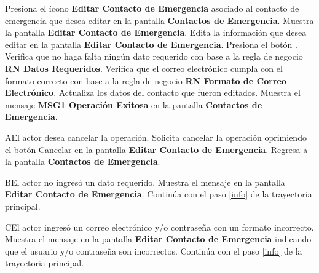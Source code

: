  \begin{UCtrayectoria}
 	
 	\UCpaso [\UCactor] Presiona el ícono \textbf{Editar Contacto de Emergencia} asociado al contacto de emergencia que desea editar en la pantalla \textbf{Contactos de Emergencia}.
 	\UCpaso Muestra la pantalla \textbf{Editar Contacto de Emergencia}.
 	\UCpaso [\UCactor] Edita la información que desea editar en la pantalla \textbf{Editar Contacto de Emergencia}. \label{info}
 	\UCpaso [\UCactor] Presiona el botón .
	\UCpaso Verifica que no haga falta ningún dato requerido con base a la regla de negocio \textbf{RN Datos Requeridos}.
	\UCpaso Verifica que el correo electrónico cumpla con el formato correcto con base a la regla de negocio \textbf{RN Formato de Correo Electrónico}.
	\UCpaso Actualiza los datos del contacto que fueron editados.
	\UCpaso Muestra el mensaje \textbf{MSG1 Operación Exitosa} en la pantalla \textbf{Contactos de Emergencia}.
    
 \end{UCtrayectoria}

 \begin{UCtrayectoriaA}{A}{El actor desea cancelar la operación.}
    \UCpaso[\UCactor] Solicita cancelar la operación oprimiendo el botón Cancelar en la pantalla \textbf{Editar Contacto de Emergencia}.
   \UCpaso Regresa a la pantalla \textbf{Contactos de Emergencia}.
 \end{UCtrayectoriaA}
 
 \begin{UCtrayectoriaA}{B}{El actor no ingresó un dato requerido.}
    \UCpaso[\UCsist] Muestra el mensaje  en la pantalla \textbf{Editar Contacto de Emergencia}.
    \UCpaso[] Continúa con el paso \ref{info} de la trayectoria principal.
 \end{UCtrayectoriaA}
 
 \begin{UCtrayectoriaA}{C}{El actor ingresó un correo electrónico y/o contraseña con un formato incorrecto.}
    \UCpaso[\UCsist] Muestra el mensaje  en la pantalla \textbf{Editar Contacto de Emergencia} indicando que el usuario y/o contraseña son incorrectos.
    \UCpaso[] Continúa con el paso \ref{info} de la trayectoria principal.
 \end{UCtrayectoriaA} 


 


